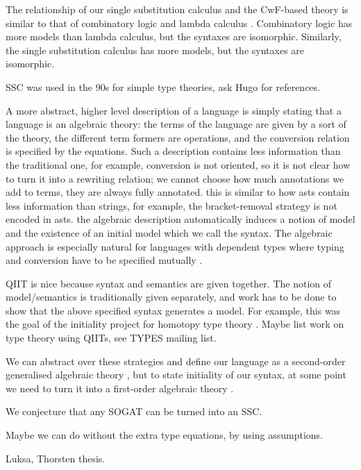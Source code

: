 \documentclass[sigplan,10pt,anonymous,review]{acmart}\settopmatter{printfolios=true,printccs=false,printacmref=false}
\begin{document}
The relationship of our single substitution calculus and the CwF-based
theory is similar to that of combinatory logic and lambda calculus
\cite{DBLP:conf/fscd/AltenkirchKSV23}. Combinatory logic has more
models than lambda calculus, but the syntaxes are
isomorphic. Similarly, the single substitution calculus has more
models, but the syntaxes are isomorphic.

SSC was used in the 90s for simple type theories, ask Hugo for references.

A more abstract, higher level description of a language is simply
stating that a language is an algebraic theory: the terms of the
language are given by a sort of the theory, the different term formers
are operations, and the conversion relation is specified by the
equations. Such a description contains less information than the
traditional one, for example, conversion is not oriented, so it is not
clear how to turn it into a rewriting relation; we cannot choose how
much annotations we add to terms, they are always fully
annotated. this is similar to how asts contain less information than
strings, for example, the bracket-removal strategy is not encoded in
asts. the algebraic description automatically induces a notion of
model and the existence of an initial model
\cite{DBLP:journals/pacmpl/KaposiKA19} which we call the syntax. The
algebraic approach is especially natural for languages with dependent
types where typing and conversion have to be specified mutually
\cite{DBLP:conf/popl/AltenkirchK16}.

QIIT is nice because syntax and semantics are given together. The
notion of model/semantics is traditionally given separately, and work
has to be done to show that the above specified syntax generates a
model. For example, this was the goal of the initiality project for
homotopy type theory \cite{brunerie}. Maybe list work on type theory
using QIITs, see TYPES mailing list.

We can abstract over these strategies and define our language as a
second-order generalised algebraic theory
\cite{DBLP:journals/corr/abs-1904-04097}, but to state initiality of
our syntax, at some point we need to turn it into a first-order
algebraic theory \cite{DBLP:conf/fscd/BocquetKS23}.

We conjecture that any SOGAT can be turned into an SSC.

Maybe we can do without the extra type equations, by using assumptions.

Luksa, Thorsten thesis.

{}

\end{document}
